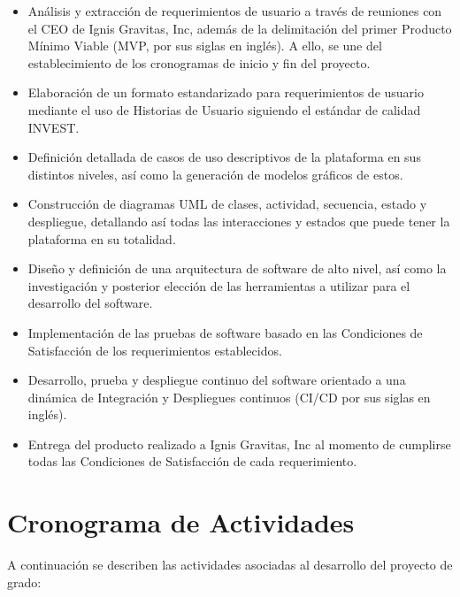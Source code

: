\begin{itemize}
	\itemsep1pt \parskip1pt 
		\item Análisis y extracción de requerimientos de usuario a través de reuniones con el CEO de Ignis Gravitas, Inc, además de la delimitación del primer Producto Mínimo Viable (MVP, por sus siglas en inglés). A ello, se une del establecimiento de los cronogramas de inicio y fin del proyecto.
		\item Elaboración de un formato estandarizado para requerimientos de usuario mediante el uso de Historias de Usuario siguiendo el estándar de calidad INVEST.
		\item Definición detallada de casos de uso descriptivos de la plataforma en sus distintos niveles, así como la generación de modelos gráficos de estos.
		\item Construcción de diagramas UML de clases, actividad, secuencia, estado y despliegue, detallando así todas las interacciones y estados que puede tener la plataforma en su totalidad.
		\item Diseño y definición de una arquitectura de software de alto nivel, así como la investigación y posterior elección de las herramientas a utilizar para el desarrollo del software.
		\item Implementación de las pruebas de software basado en las Condiciones de Satisfacción de los requerimientos establecidos.
		\item Desarrollo, prueba y despliegue continuo del software orientado a una dinámica de Integración y Despliegues continuos (CI/CD por sus siglas en inglés).
		\item Entrega del producto realizado a Ignis Gravitas, Inc al momento de cumplirse todas las Condiciones de Satisfacción de cada requerimiento.
\end{itemize}

\section*{Cronograma de Actividades}

A continuación se describen las actividades asociadas al desarrollo del proyecto de grado:

